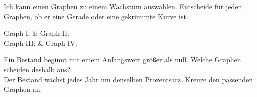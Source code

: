 \begin{aufgabe}{Ich kann einen Graphen zu einem Wachstum auswählen. Entscheide für jeden Graphen, ob er eine Gerade oder eine gekrümmte Kurve ist.}

\begin{ksys}[xmin=0,xmax=4,ymin=0,ymax=4,ablesen]
\end{ksys}\hspace{0.5cm}\begin{ksys}[xmin=0,xmax=4,ymin=0,ymax=4,ablesen]
\end{ksys}\hspace{0.5cm}\begin{ksys}[xmin=0,xmax=4,ymin=0,ymax=4,ablesen]
\end{ksys}\hspace{0.5cm}\begin{ksys}[xmin=0,xmax=4,ymin=0,ymax=4,ablesen]
\end{ksys}

\begin{teilezwei}
\tz Graph I:  & \tz Graph II:  \\
\tz Graph III:  & \tz Graph IV:  \\
\end{teilezwei}
\begin{teile}
\teil Ein Bestand beginnt mit einem Anfangswert größer als null. Welche Graphen scheiden deshalb aus? \\ 
\teil Der Bestand wächst jedes Jahr um denselben Prozentsatz. Kreuze den passenden Graphen an. \\ 
\end{teile}
\end{aufgabe}

